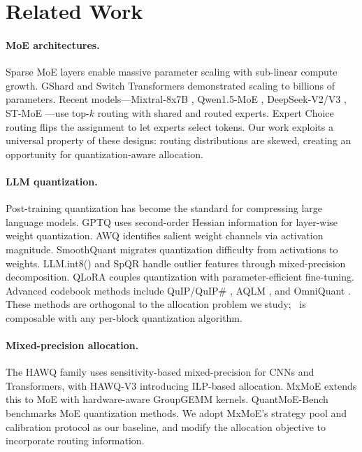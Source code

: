 \section{Related Work}
\label{sec:related}

\paragraph{MoE architectures.}
Sparse MoE layers \citep{shazeer2017outrageously} enable massive parameter scaling with sub-linear compute growth. GShard \citep{lepikhin2021gshard} and Switch Transformers \citep{fedus2022switch} demonstrated scaling to billions of parameters. Recent models---Mixtral-8x7B \citep{jiang2024mixtral}, Qwen1.5-MoE \citep{bai2023qwen}, DeepSeek-V2/V3 \citep{deepseekai2024deepseekv2,deepseekai2024deepseekv3}, ST-MoE \citep{zoph2022stmoe}---use top-$k$ routing with shared and routed experts. Expert Choice routing \citep{zhou2022expertchoice} flips the assignment to let experts select tokens. Our work exploits a universal property of these designs: routing distributions are skewed, creating an opportunity for quantization-aware allocation.

\paragraph{LLM quantization.}
Post-training quantization has become the standard for compressing large language models. GPTQ \citep{frantar2023gptq} uses second-order Hessian information for layer-wise weight quantization. AWQ \citep{lin2024awq} identifies salient weight channels via activation magnitude. SmoothQuant \citep{xiao2023smoothquant} migrates quantization difficulty from activations to weights. LLM.int8() \citep{dettmers2022llmint8} and SpQR \citep{dettmers2024spqr} handle outlier features through mixed-precision decomposition. QLoRA \citep{dettmers2023qlora} couples quantization with parameter-efficient fine-tuning. Advanced codebook methods include QuIP/QuIP\# \citep{chee2024quip,tseng2024quipsharp}, AQLM \citep{egiazarian2024aqlm}, and OmniQuant \citep{shao2024omniquant}. These methods are orthogonal to the allocation problem we study; \method\ is composable with any per-block quantization algorithm.

\paragraph{Mixed-precision allocation.}
The HAWQ family \citep{dong2019hawq,yao2021hawqv3} uses sensitivity-based mixed-precision for CNNs and Transformers, with HAWQ-V3 introducing ILP-based allocation. MxMoE \citep{duanmu2025mxmoe} extends this to MoE with hardware-aware GroupGEMM kernels. QuantMoE-Bench \citep{li2024quantmoebench} benchmarks MoE quantization methods. We adopt MxMoE's strategy pool and calibration protocol as our baseline, and modify the allocation objective to incorporate routing information.

